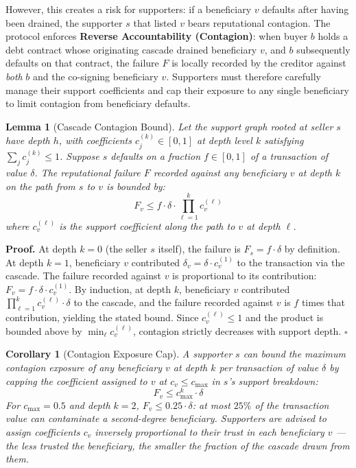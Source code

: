 \documentclass[11pt]{article}
\newtheorem{lemma}[theorem]{Lemma}
\newtheorem{corollary}[theorem]{Corollary}
\newcommand{\qed}{\hfill}
\newenvironment{proof}{\noindent\textbf{Proof.}}{\qed$\square$\par\medskip}
\begin{document}
However, this creates a risk for supporters: if a beneficiary $v$ defaults after having been drained, the supporter $s$ that listed $v$ bears reputational contagion. The protocol enforces \textbf{Reverse Accountability (Contagion)}: when buyer $b$ holds a debt contract whose originating cascade drained beneficiary $v$, and $b$ subsequently defaults on that contract, the failure $F$ is locally recorded by the creditor against \emph{both} $b$ and the co-signing beneficiary $v$. Supporters must therefore carefully manage their support coefficients and cap their exposure to any single beneficiary to limit contagion from beneficiary defaults.

\begin{lemma}[Cascade Contagion Bound]\label{lem:cascade_contagion}
Let the support graph rooted at seller $s$ have depth $h$, with coefficients $c^{(k)}_j \in [0,1]$ at depth level $k$ satisfying $\sum_j c^{(k)}_j \leq 1$. Suppose $s$ defaults on a fraction $f \in [0,1]$ of a transaction of value $\delta$. The reputational failure $F$ recorded against any beneficiary $v$ at depth $k$ on the path from $s$ to $v$ is bounded by:
\begin{equation}
    F_v \leq f \cdot \delta \cdot \prod_{\ell=1}^{k} c^{(\ell)}_v
\end{equation}
where $c^{(\ell)}_v$ is the support coefficient along the path to $v$ at depth $\ell$.
\end{lemma}

\begin{proof}
At depth $k = 0$ (the seller $s$ itself), the failure is $F_s = f \cdot \delta$ by definition. At depth $k = 1$, beneficiary $v$ contributed $\delta_v = \delta \cdot c^{(1)}_v$ to the transaction via the cascade. The failure recorded against $v$ is proportional to its contribution: $F_v = f \cdot \delta \cdot c^{(1)}_v$. By induction, at depth $k$, beneficiary $v$ contributed $\prod_{\ell=1}^{k} c^{(\ell)}_v \cdot \delta$ to the cascade, and the failure recorded against $v$ is $f$ times that contribution, yielding the stated bound. Since $c^{(\ell)}_v \leq 1$ and the product is bounded above by $\min_\ell c^{(\ell)}_v$, contagion strictly decreases with support depth. \qed
\end{proof}

\begin{corollary}[Contagion Exposure Cap]\label{cor:contagion_cap}
A supporter $s$ can bound the maximum contagion exposure of any beneficiary $v$ at depth $k$ per transaction of value $\delta$ by capping the coefficient assigned to $v$ at $c_v \leq c_{\max}$ in $s$'s support breakdown:
\begin{equation}
    F_v \leq c_{\max}^k \cdot \delta
\end{equation}
For $c_{\max} = 0.5$ and depth $k = 2$, $F_v \leq 0.25 \cdot \delta$: at most $25\%$ of the transaction value can contaminate a second-degree beneficiary. Supporters are advised to assign coefficients $c_v$ inversely proportional to their trust in each beneficiary $v$ --- the less trusted the beneficiary, the smaller the fraction of the cascade drawn from them.
\end{corollary}
\end{document}
